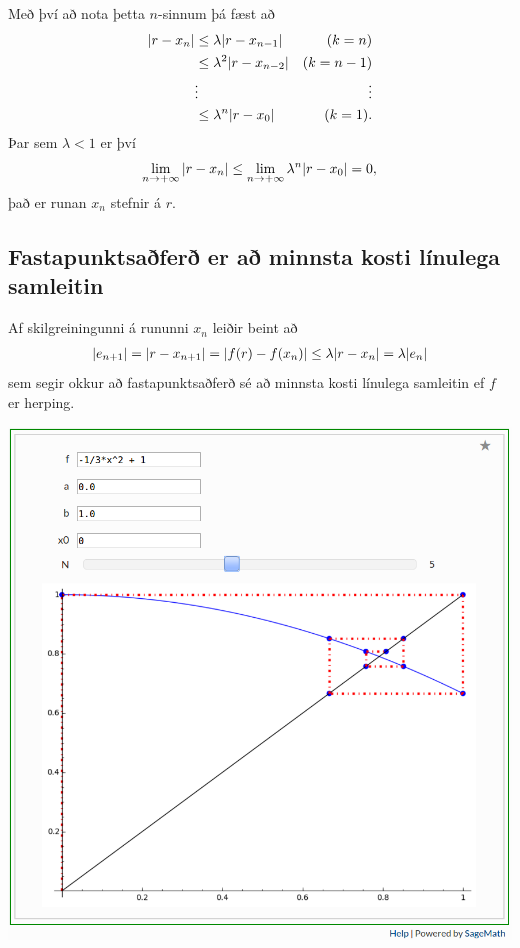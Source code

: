 \documentclass[letterpaper,10pt,icelandic]{sphinxmanual}
\begin{document}
Með því að nota þetta \(n\)-sinnum þá fæst að
\begin{gather}
\begin{split}\begin{aligned}
    |r - x_n|   &\leq \lambda |r - x_{n-1}| & (k=n)\\
    &\leq \lambda^2 |r - x_{n-2}| & (k=n-1)\\
    &\vdots & \vdots\\
    &\leq \lambda^n |r - x_0| & (k=1).
\end{aligned}\end{split}\notag
\end{gather}
Þar sem \(\lambda < 1\) er því
\begin{gather}
\begin{split}\lim\limits_{n \to +\infty} |r - x_n|
\leq \lim\limits_{n \to +\infty} \lambda^n |r - x_0|
= 0,\end{split}\notag
\end{gather}
það er runan \(x_n\) stefnir á \(r\).


\subsection{Fastapunktsaðferð er að minnsta kosti línulega samleitin}
\label{kafli02:fastapunktsafer-er-a-minnsta-kosti-linulega-samleitin}
Af skilgreiningunni á rununni \(x_n\) leiðir beint að
\begin{gather}
\begin{split}|e_{n+1}|=|r-x_{n+1}|=|f(r)-f(x_n)|\leq \lambda|r-x_n|=\lambda|e_n|\end{split}\notag
\end{gather}
sem segir okkur að fastapunktsaðferð sé að minnsta kosti línulega
samleitin ef \(f\) er herping.


\begin{center}
\includegraphics[width=8 cm,keepaspectratio=true]{fixedpoint.png}

\end{center}
\end{document}
